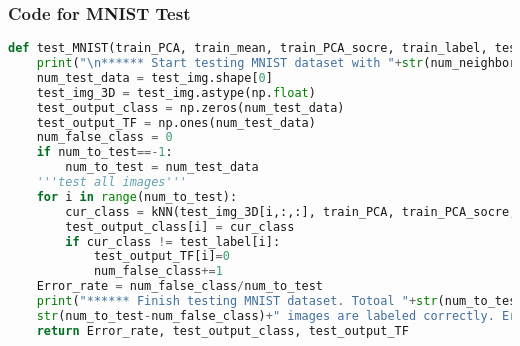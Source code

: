 \documentclass[12pt]{article}
\begin{document}
\vspace{2em}
\subsubsection*{Code for MNIST Test}
\begin{lstlisting}[language=Python]
def test_MNIST(train_PCA, train_mean, train_PCA_socre, train_label, test_img, test_label, num_neighbor, num_to_test):
	print("\n****** Start testing MNIST dataset with "+str(num_neighbor)+" nearest neighbors ******")
	num_test_data = test_img.shape[0]
	test_img_3D = test_img.astype(np.float)
	test_output_class = np.zeros(num_test_data)
	test_output_TF = np.ones(num_test_data)
	num_false_class = 0
	if num_to_test==-1:
		num_to_test = num_test_data
	'''test all images'''
	for i in range(num_to_test):
		cur_class = kNN(test_img_3D[i,:,:], train_PCA, train_PCA_socre, train_mean, train_label, num_neighbor)
		test_output_class[i] = cur_class
		if cur_class != test_label[i]:
			test_output_TF[i]=0
			num_false_class+=1
	Error_rate = num_false_class/num_to_test
	print("****** Finish testing MNIST dataset. Totoal "+str(num_to_test)+" images tested. "+
	str(num_to_test-num_false_class)+" images are labeled correctly. Error rate = "+str(Error_rate*100)+"% ******")
	return Error_rate, test_output_class, test_output_TF
\end{lstlisting}
\end{document}
